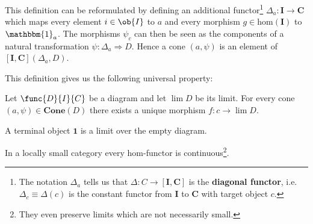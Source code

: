     \begin{adefinition}
        This definition can be reformulated by defining an additional functor\footnote{The notation $\Delta_a$ tells us that $\Delta:C\rightarrow [\mathbf{I},\mathbf{C}]$ is the \textbf{diagonal functor}, i.e. $\Delta_c\equiv\Delta(c)$ is the constant functor from $\mathbf{I}$ to $\mathbf{C}$ with target object $c$.} $\Delta_a:\mathbf{I}\rightarrow\mathbf{C}$ which maps every element $i\in\ob{I}$ to $a$ and every morphism $g\in\text{hom}(\mathbf{I})$ to $\mathbbm{1}_a$. The morphisms $\psi_c$ can then be seen as the components of a natural transformation $\psi:\Delta_a\Rightarrow D$. Hence a cone $(a, \psi)$ is an element of $[\mathbf{I}, \mathbf{C}](\Delta_a, D)$.
    \end{adefinition}


    This definition gives us the following universal property:
    \begin{uproperty}
        Let $\func{D}{I}{C}$ be a diagram and let $\lim D$ be its limit. For every cone $(a, \psi)\in\mathbf{Cone}(D)$ there exists a unique morphism $f:c\rightarrow\lim D$.
    \end{uproperty}

    \begin{example}
        A terminal object $\mathbf{1}$ is a limit over the empty diagram.
    \end{example}

    \begin{property}
        In a locally small category every hom-functor is continuous\footnote{They even preserve limits which are not necessarily small.}.
    \end{property}


